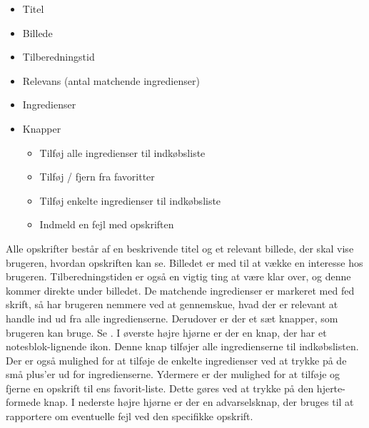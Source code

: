 \begin{itemize}[noitemsep]
\item Titel
\item Billede
\item Tilberedningstid
\item Relevans (antal matchende ingredienser)
\item Ingredienser
\item Knapper
\begin{itemize}[noitemsep]
\item Tilføj alle ingredienser til indkøbsliste
\item Tilføj / fjern fra favoritter
\item Tilføj enkelte ingredienser til indkøbsliste
\item Indmeld en fejl med opskriften
\end{itemize}
\end{itemize}

Alle opskrifter består af en beskrivende titel og et relevant billede, der skal vise brugeren, hvordan opskriften kan se. Billedet er med til at vække en interesse hos brugeren. Tilberedningstiden er også en vigtig ting at være klar over, og denne kommer direkte under billedet. De matchende ingredienser er markeret med fed skrift, så har brugeren nemmere ved at gennemskue, hvad der \fx er relevant at handle ind ud fra alle ingredienserne. Derudover er der et sæt knapper, som brugeren kan bruge. Se . I øverste højre hjørne er der en knap, der har et notesblok-lignende ikon. Denne knap tilføjer alle ingredienserne til indkøbslisten. Der er også mulighed for at tilføje de enkelte ingredienser ved at trykke på de små plus'er ud for ingredienserne. Ydermere er der mulighed for at tilføje og fjerne en opskrift til ens favorit-liste. Dette gøres ved at trykke på den hjerte-formede knap. I nederste højre hjørne er der en advarselsknap, der bruges til at rapportere om eventuelle fejl ved den specifikke opskrift.

